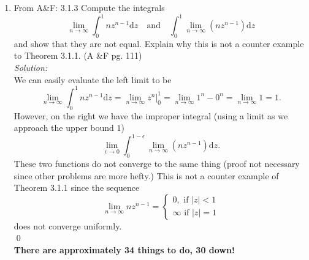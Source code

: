 \documentclass[10pt]{amsart}
\newcommand{\D}{\mathrm{d}}
\theoremstyle{nonumberplain}
\begin{document}
\begin{enumerate}[label={\bf {\arabic*}:}]
\newpage
\item From A\&F: 3.1.3
Compute the integrals
$$
\lim_{n \rightarrow \infty} \int_0^1 nz^{n -1}\D z \quad \text{and} \quad \int_0^1 \lim_{n \rightarrow \infty} \left(nz^{n -1} \right) \D z
$$
and show that they are not equal.
Explain why this is not a counter example to Theorem 3.1.1. (A \&F pg. 111) \\
\textit{Solution:} \\
We can easily evaluate the left limit to be
$$
\lim_{n \rightarrow \infty} \int_0^1 nz^{n -1}\D z = \lim_{n \rightarrow \infty} \left. z^n \right|_0^1 = \lim_{n \rightarrow \infty} 1^n - 0^n = \lim_{n \rightarrow \infty} 1 = 1.
$$
However, on the right we have the improper integral (using a limit as we approach the upper bound $1$)
$$
\lim_{\epsilon \rightarrow 0}\int_0^{1-\epsilon} \lim_{n \rightarrow \infty} \left(nz^{n -1} \right) \D z.
$$
These two functions do not converge to the same thing (proof not necessary since other problems are more hefty.)
This is not a counter example of Theorem 3.1.1 since the sequence
$$
\lim_{n \rightarrow \infty} nz^{n - 1} =
\begin{cases}
0, \text{ if } |z| < 1 \\
\infty \text{ if } |z| = 1
\end{cases}
$$
does not converge uniformly. \\
\qed \\

\textbf{There are approximately 34 things to do, 30 down!}
\end{enumerate}
\end{document}
